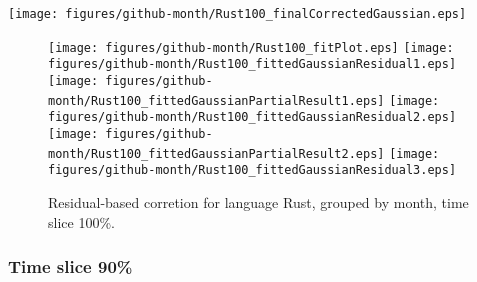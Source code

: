 \begin{center}
{\texttt{[image: figures/github-month/Rust100\_finalCorrectedGaussian.eps]}}
\end{center}

\FloatBarrier

\begin{figure}[t]
\centering
{}
{\texttt{[image: figures/github-month/Rust100\_fitPlot.eps]}}
{\texttt{[image: figures/github-month/Rust100\_fittedGaussianResidual1.eps]}}
{\texttt{[image: figures/github-month/Rust100\_fittedGaussianPartialResult1.eps]}}
{\texttt{[image: figures/github-month/Rust100\_fittedGaussianResidual2.eps]}}
{\texttt{[image: figures/github-month/Rust100\_fittedGaussianPartialResult2.eps]}}
{\texttt{[image: figures/github-month/Rust100\_fittedGaussianResidual3.eps]}}
\caption{Residual-based corretion for language Rust, grouped by month, time slice 100\%.}
\end{figure}


\FloatBarrier


\subsubsection{Time slice 90\%}

